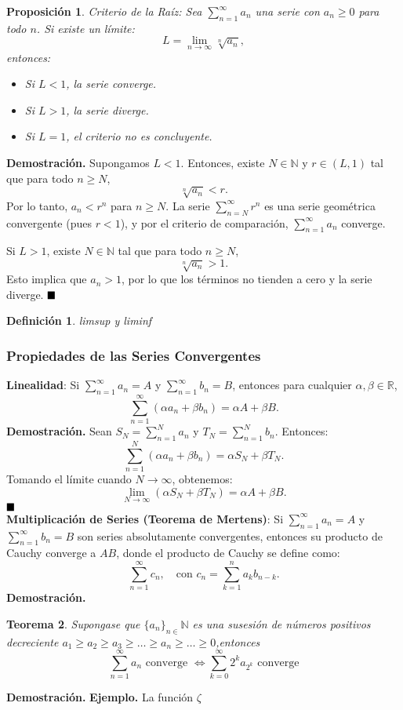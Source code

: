 \documentclass[letterpaper]{book}
\newtheorem{teorema}{Teorema}[section]
\newtheorem{prop}[teorema]{Proposici\'on}
\newtheorem{def.}{Definici\'on}[section]
\newcommand{\nat}{\ensuremath{ \mathbb N }}
\newcommand{\eje}{{\noindent \sc \textbf{Ejemplo. }}}
\newcommand{\dem}{{\noindent \sc \textbf{Demostraci\'on. }}}
\newcommand{\QED}{\ensuremath{\hspace*{0em plus 1fill}\blacksquare}}
\begin{document}
\begin{prop}{Criterio de la Raíz}:
    Sea \(\sum_{n=1}^\infty a_n\) una serie con \(a_n \geq 0\) para todo \(n\). Si existe un límite:
    \[
    L = \lim_{n \to \infty} \sqrt[n]{a_n},
    \]
    entonces:
    \begin{itemize}
        \item Si \(L < 1\), la serie converge.
        \item Si \(L > 1\), la serie diverge.
        \item Si \(L = 1\), el criterio no es concluyente.
    \end{itemize}
\end{prop}
\dem Supongamos \(L < 1\). Entonces, existe \(N \in \mathbb{N}\) y \(r \in (L, 1)\) tal que para todo \(n \geq N\),
    \[
    \sqrt[n]{a_n} < r.
    \]
    Por lo tanto, \(a_n < r^n\) para \(n \geq N\). La serie \(\sum_{n=N}^\infty r^n\) es una serie geométrica convergente (pues \(r < 1\)), y por el criterio de comparación, \(\sum_{n=1}^\infty a_n\) converge.

    Si \(L > 1\), existe \(N \in \mathbb{N}\) tal que para todo \(n \geq N\),
    \[
    \sqrt[n]{a_n} > 1.
    \]
    Esto implica que \(a_n > 1\), por lo que los términos no tienden a cero y la serie diverge.
\QED

\begin{def.}{limsup y liminf}
\end{def.}


\subsubsection{Propiedades de las Series Convergentes}
\noindent\textbf{Linealidad}:
Si \(\sum_{n=1}^\infty a_n = A\) y \(\sum_{n=1}^\infty b_n = B\), entonces para cualquier \(\alpha, \beta \in \mathbb{R}\),
    \[
    \sum_{n=1}^\infty (\alpha a_n + \beta b_n) = \alpha A + \beta B.
    \]
\dem Sean \(S_N = \sum_{n=1}^N a_n\) y \(T_N = \sum_{n=1}^N b_n\). Entonces:
    \[
    \sum_{n=1}^N (\alpha a_n + \beta b_n) = \alpha S_N + \beta T_N.
    \]
Tomando el límite cuando \(N \to \infty\), obtenemos:
    \[
    \lim_{N \to \infty} \left( \alpha S_N + \beta T_N \right) = \alpha A + \beta B.
    \]
\QED\\
\noindent\textbf{Multiplicación de Series (Teorema de Mertens)}:
    Si \(\sum_{n=1}^\infty a_n = A\) y \(\sum_{n=1}^\infty b_n = B\) son series absolutamente convergentes, entonces su producto de Cauchy converge a \(AB\), donde el producto de Cauchy se define como:
    \[
    \sum_{n=1}^\infty c_n, \quad \text{con } c_n = \sum_{k=1}^n a_k b_{n-k}.
    \]
\dem
\begin{teorema}
  Supongase que \(\{a_n\}_{n\in}\nat\) es una susesión de números positivos decreciente \(a_1\geq a_2\geq a_3\geq\dots\geq a_n\geq\dots\geq0\),entonces
  \[
   \sum_{n=1}^\infty a_n\text{ converge }\iff  \sum_{k=0}^\infty 2^ka_{2^k}\text{ converge}
  \]
\end{teorema}
\dem
\eje La función \(\zeta\)
\end{document}
